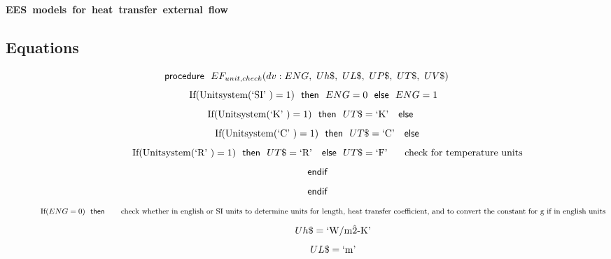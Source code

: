 \documentclass[10pt,fleqn]{article}
\newcommand{\F}[1]{\mbox{$#1$}}
\newcommand{\K}[1]{\mbox{\sf#1\ \ \mit}}
\newcommand{\KS}[1]{\mbox{\sf\ \ #1\ \ \mit}}
\newcommand{\SC}[1]{\mbox{`#1'}\  }
\newcommand{\V}[1]{\mbox{$ #1 $}}
\newcommand{\I}{\mbox{\hspace{0.20in}}}
\begin{document}
\begin{center}
\bf \mbox{EES models for heat transfer external flow}
\vspace{0.2 in}
\end{center}
\subsection*{Equations}
\begin{equation}
\label{EES Eqn:1}
\K{procedure} \F{EF_{unit,check}}{ \left( \V{dv} :\V{ENG} ,\ Uh\$,\ UL\$,\ UP\$,\ UT\$,\ UV\$ \right) } 
\end{equation}
\begin{equation}
\I \label{EES Eqn:2}
\mbox{If}{ \left( \mbox{Unitsystem}{ \left( \SC{SI} \right) }=1 \right) } \KS{then} \V{ENG} =0 \KS{else} \V{ENG} =1 
\end{equation}
\begin{equation}
\I \label{EES Eqn:3}
\mbox{If}{ \left( \mbox{Unitsystem}{ \left( \SC{K} \right) }=1 \right) } \KS{then} UT\$=\SC{K} \KS{else} 
\end{equation}
\begin{equation}
\I \I \label{EES Eqn:4}
\mbox{If}{ \left( \mbox{Unitsystem}{ \left( \SC{C} \right) }=1 \right) } \KS{then} UT\$=\SC{C} \KS{else} 
\end{equation}
\begin{equation}
\I \I \I \label{EES Eqn:5}
\mbox{If}{ \left( \mbox{Unitsystem}{ \left( \SC{R} \right) }=1 \right) } \KS{then} UT\$=\SC{R} \KS{else} UT\$=\SC{F}	 
\mbox{\I check for temperature units}
\end{equation}
\begin{equation}
\I \I \label{EES Eqn:6}
\K{endif} 
\end{equation}
\begin{equation}
\I \I \label{EES Eqn:7}
\K{endif} 
\end{equation}
\begin{equation}
\I \I \I \label{EES Eqn:8}
\mbox{If}{ \left( \V{ENG} =0 \right) } \KS{then}	 
\mbox{\I check whether in english or SI units to determine units for length, heat transfer coefficient, and to convert the constant for g if in english units}
\end{equation}
\begin{equation}
\I \I \I \I \label{EES Eqn:9}
Uh\$=\SC{W/m\^2-K} 
\end{equation}
\begin{equation}
\I \I \I \I \label{EES Eqn:10}
UL\$=\SC{m} 
\end{equation}
\end{document}
